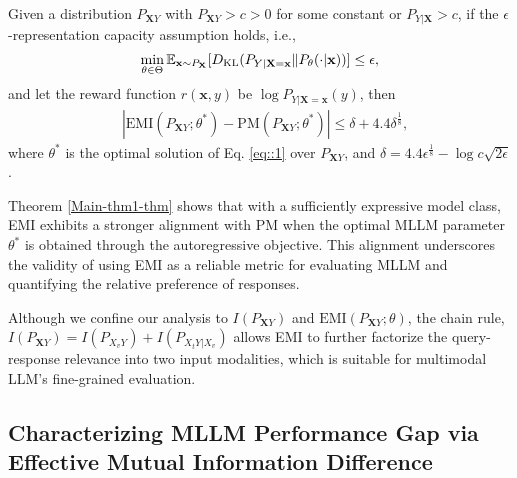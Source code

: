 \begin{theorem}\label{Main-thm1-thm}
    Given a distribution $P_{\mathbf{X}Y}$ with $P_{\mathbf{X}Y}>c>0$ for some constant or $P_{Y|\mathbf{X}}>c$, if  the $\epsilon$-representation capacity assumption holds, i.e.,
\begin{equation}\label{Expression}
    \min_{\theta\in \Theta} \mathbb{E}_{\mathbf{x}\sim P_{\mathbf{X}}} [D_{\rm KL}(P_{Y|\mathbf{X}=\mathbf{x}}\| P_{\theta}(\cdot|\mathbf{x}) )] \leq \epsilon,
\end{equation}
and let the reward function $r(\mathbf{x},y)$ be $\log P_{Y|\mathbf{X}=\mathbf{x}}(y)$, then
\begin{equation*}
    \begin{split}
        &|\text{EMI}(P_{\mathbf{X}Y};\theta^*) - \text{PM}(P_{\mathbf{X}Y};\theta^*)| \leq \delta + 4.4\delta^{\frac{1}{8}}, \nonumber
    \end{split}
    \end{equation*}
    \vspace{-0.2em}
    where $\theta^*$ is the optimal solution of Eq. \eqref{eq::1} over $P_{\mathbf{X}Y}$, and $\delta = 4.4\epsilon^{\frac{1}{8}}-\log c \sqrt{2\epsilon}$.
\end{theorem}
Theorem \ref{Main-thm1-thm} shows that with a sufficiently expressive model class, EMI exhibits a stronger alignment with PM when the optimal MLLM parameter $\theta^*$ is obtained through the autoregressive objective. This alignment underscores the validity of using EMI as a reliable metric for evaluating MLLM and quantifying the relative preference of responses.

Although we confine our analysis to $I(P_{\mathbf{X}Y})$ and $\text{EMI}(P_{\mathbf{X}Y};\theta)$, the chain rule, $I(P_{\mathbf{X}Y})=I(P_{X_{v}Y})+I(P_{X_{t}Y|X_v})$ allows EMI to further factorize the query-response relevance into two input modalities, which is suitable for multimodal LLM's fine-grained evaluation. 

\subsection{Characterizing MLLM Performance Gap via Effective Mutual Information Difference} \label{sec:3_3_emid}


